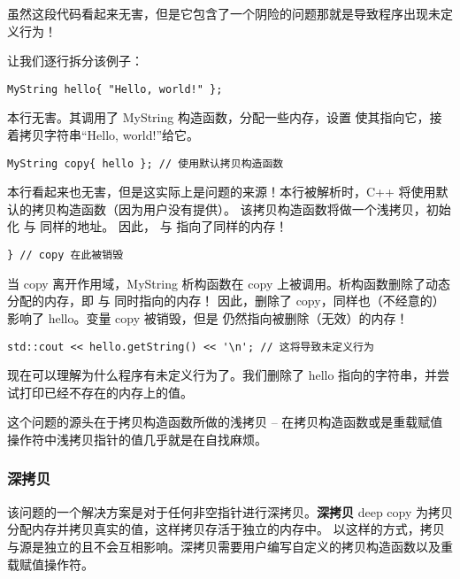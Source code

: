 \documentclass[../../LearnCpp.tex]{subfiles}
\begin{document}
虽然这段代码看起来无害，但是它包含了一个阴险的问题那就是导致程序出现未定义行为！

让我们逐行拆分该例子：

\begin{lstlisting}
MyString hello{ "Hello, world!" };
\end{lstlisting}

本行无害。其调用了 MyString 构造函数，分配一些内存，设置  使其指向它，接着拷贝字符串“Hello, world!”给它。

\begin{lstlisting}
MyString copy{ hello }; // 使用默认拷贝构造函数
\end{lstlisting}

本行看起来也无害，但是这实际上是问题的来源！本行被解析时，C++ 将使用默认的拷贝构造函数（因为用户没有提供）。
该拷贝构造函数将做一个浅拷贝，初始化  与  同样的地址。
因此， 与  指向了同样的内存！

\begin{lstlisting}
} // copy 在此被销毁
\end{lstlisting}

当 copy 离开作用域，MyString 析构函数在 copy 上被调用。析构函数删除了动态分配的内存，即  与  同时指向的内存！
因此，删除了 copy，同样也（不经意的）影响了 hello。变量 copy 被销毁，但是  仍然指向被删除（无效）的内存！

\begin{lstlisting}
std::cout << hello.getString() << '\n'; // 这将导致未定义行为
\end{lstlisting}

现在可以理解为什么程序有未定义行为了。我们删除了 hello 指向的字符串，并尝试打印已经不存在的内存上的值。

这个问题的源头在于拷贝构造函数所做的浅拷贝 -- 在拷贝构造函数或是重载赋值操作符中浅拷贝指针的值几乎就是在自找麻烦。

\subsubsection*{深拷贝}

该问题的一个解决方案是对于任何非空指针进行深拷贝。\textbf{深拷贝} deep copy 为拷贝分配内存并拷贝真实的值，这样拷贝存活于独立的内存中。
以这样的方式，拷贝与源是独立的且不会互相影响。深拷贝需要用户编写自定义的拷贝构造函数以及重载赋值操作符。
\end{document}
